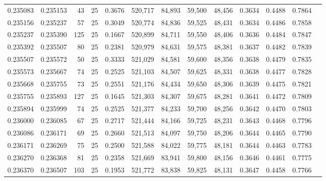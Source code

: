\begin{tabular}{rrrrrrrrrrrrr}
0.235083 & 0.235153 &    43 &  25 &                                     0.3676 & 520,717 &  84,893 &  59,500 &  48,456 & 0.3634 & 0.4488 & 0.7864 \\
0.235156 & 0.235237 &    57 &  25 &                                     0.3049 & 520,774 &  84,836 &  59,525 &  48,431 & 0.3634 & 0.4486 & 0.7858 \\
0.235237 & 0.235390 &   125 &  25 &                                     0.1667 & 520,899 &  84,711 &  59,550 &  48,406 & 0.3636 & 0.4484 & 0.7847 \\
0.235392 & 0.235507 &    80 &  25 &                                     0.2381 & 520,979 &  84,631 &  59,575 &  48,381 & 0.3637 & 0.4482 & 0.7839 \\
0.235507 & 0.235572 &    50 &  25 &                                     0.3333 & 521,029 &  84,581 &  59,600 &  48,356 & 0.3638 & 0.4479 & 0.7835 \\
0.235573 & 0.235667 &    74 &  25 &                                     0.2525 & 521,103 &  84,507 &  59,625 &  48,331 & 0.3638 & 0.4477 & 0.7828 \\
0.235668 & 0.235755 &    73 &  25 &                                     0.2551 & 521,176 &  84,434 &  59,650 &  48,306 & 0.3639 & 0.4475 & 0.7821 \\
0.235755 & 0.235893 &   127 &  25 &                                     0.1645 & 521,303 &  84,307 &  59,675 &  48,281 & 0.3641 & 0.4472 & 0.7809 \\
0.235894 & 0.235999 &    74 &  25 &                                     0.2525 & 521,377 &  84,233 &  59,700 &  48,256 & 0.3642 & 0.4470 & 0.7803 \\
0.236000 & 0.236085 &    67 &  25 &                                     0.2717 & 521,444 &  84,166 &  59,725 &  48,231 & 0.3643 & 0.4468 & 0.7796 \\
0.236086 & 0.236171 &    69 &  25 &                                     0.2660 & 521,513 &  84,097 &  59,750 &  48,206 & 0.3644 & 0.4465 & 0.7790 \\
0.236171 & 0.236269 &    75 &  25 &                                     0.2500 & 521,588 &  84,022 &  59,775 &  48,181 & 0.3644 & 0.4463 & 0.7783 \\
0.236270 & 0.236368 &    81 &  25 &                                     0.2358 & 521,669 &  83,941 &  59,800 &  48,156 & 0.3646 & 0.4461 & 0.7775 \\
0.236370 & 0.236507 &   103 &  25 &                                     0.1953 & 521,772 &  83,838 &  59,825 &  48,131 & 0.3647 & 0.4458 & 0.7766 \\

\end{tabular}
